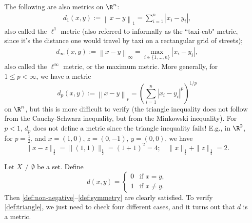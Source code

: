 \begin{example}
The following are also metrics on $\R^n$:
\begin{align*}
d_1(x,y):= \left\|x-y\right\|_1 = \sum_{i = 1}^n \left|x_i - y_i\right|,
\end{align*}%
also called the $\ell^1$ metric (also referred to informally as the ``taxi-cab" metric, since it's the distance one would travel by taxi on a rectangular grid of streets);
\begin{align*}
d_\infty(x,y):= \left\|x-y\right\|_\infty = \max_{i \in \{1,\ldots,n\}} \left|x_i - y_i\right|,
\end{align*}%
also called the $\ell^\infty$ metric, or the maximum metric.
More generally, for $1 \le p < \infty$, we have a metric
\[
d_p(x,y):= \left\|x-y\right\|_p = \left(\sum_{i = 1}^n \left|x_i - y_i\right|^p\right)^{1/p}
\]%
on $\R^n$, but this is more difficult to verify (the triangle inequality does not follow from the Cauchy-Schwarz inequality, but from the Minkowski inequality). 
For $p < 1$, $d_p$ does not define a metric since the triangle inequality fails! E.g., in $\R^2$, for $p=\frac12$, and $x=(1,0)$, $z=(0,-1)$, $y=(0,0)$, we have 
$$
\|x-z\|_{\frac12} = \|(1,1)\|_{\frac12} = (1+1)^2 = 4; \quad \|x\|_{\frac12} + \|z\|_{\frac12} = 2.
$$
\end{example}

\np

\begin{example} \label{discrete-metric}
Let $X \not= \emptyset$ be a set. Define 
$$
d(x,y) = \begin{cases} 
0 & \text{if } x=y, \\ 
1 & \text{if } x\neq y. 
\end{cases}
$$
Then \eqref{def:non-negative}--\eqref{def:symmetry} are clearly satisfied. To
verify \eqref{def:triangle}, we just need to check four different cases, and it turns
out that $d$ is a metric.
\end{example}

